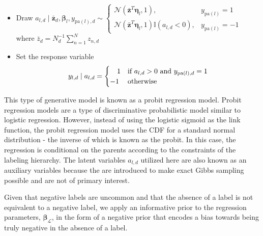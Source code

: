 \begin{enumerate}
\begin{itemize}
\begin{itemize}
\item Draw $a_{l,d}\mid \bar{\mathbf{z}}_d,\boldsymbol\beta_{l},y_{\mathrm{pa}(l),d}\sim\begin{cases}
\mathcal{N}(\bar{\mathbf{z}}^{T}\boldsymbol\eta_{l},1), & y_{\mathrm{pa}(l)}=1\\
\mathcal{N}(\bar{\mathbf{z}}^{T}\boldsymbol\eta_{l},1)\mathbb{I}(a_{l,d}<0), & y_{\mathrm{pa}(l)}=-1\end{cases}$ \\where $\bar{z}_{d}=N_{d}^{-1}\sum_{n=1}^{N}z_{n,d}$ %
 
\item Set the response variable \[
y_{l,d}\mid a_{l,d}=\begin{cases}
\ \ \ 1 & \text{if \ensuremath{a_{l,d}>0} and \ensuremath{y_{{\rm \mathrm{pa}}(l),d}=1}}\\
-1 & \text{otherwise}\end{cases}\]
 
\end{itemize}
\end{itemize}
\end{enumerate}
This type of generative model is known as a probit regression model.
Probit regression models are a type of discriminative probabilistic
model similar to logistic regression. However, instead of using the
logistic sigmoid as the link function, the probit regression model
uses the CDF for a standard normal distribution - the inverse of which
is known as the probit. In this case, the regression is conditional
on the parents according to the constraints of the labeling hierarchy.
The latent variables $a_{l,d}$ utilized here are also known as an
auxiliary variables because the are introduced to make exact Gibbs
sampling possible and are not of primary interest.

Given that negative labels are uncommon and that the absence of a
label is not equivalent to a negative label, we apply an informative
prior to the regression parameters, $\mathbf{\boldsymbol\beta}_{\mathcal{L}}$,
in the form of a negative prior that encodes a bias towards being
truly negative in the absence of a label.


